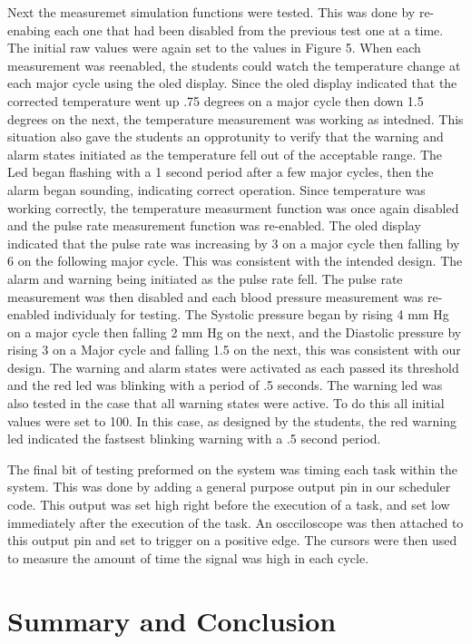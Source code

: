 \documentclass[12pt]{article} %
\begin{document}
Next the measuremet simulation functions were tested. This was done by
re-enabing each one that had been disabled from the previous test one at a
time. The initial raw values were again set to the values in Figure 5. When
each measurement was reenabled, the students could watch the temperature change
at each major cycle using the oled display. Since the oled display indicated
that the corrected temperature went up .75 degrees on a major cycle then down
1.5 degrees on the next, the temperature measurement was working as intedned.
This situation also gave the students an opprotunity to verify that the warning
and alarm states initiated as the temperature fell out of the acceptable range.
The Led began flashing with a 1 second period after a few major cycles, then
the alarm began sounding, indicating correct operation. Since temperature was
working correctly, the temperature measurment function was once again disabled
and the pulse rate measurement function was re-enabled. The oled display
indicated that the pulse rate was increasing by 3 on a major cycle then falling
by 6 on the following major cycle. This was consistent with the intended
design. The alarm and warning being initiated as the pulse rate fell. The pulse
rate measurement was then disabled and each blood pressure measurement was
re-enabled individualy for testing. The Systolic pressure began by rising 4 mm
Hg on a major cycle then falling 2 mm Hg on the next, and the Diastolic
pressure by rising 3 on a Major cycle and falling 1.5 on the next, this was
consistent with our design. The warning and alarm states were activated as each
passed its threshold and the red led was blinking with a period of .5 seconds.
The warning led was also tested in the case that all warning states were
active. To do this all initial values were set to 100. In this case, as
designed by the students, the red warning led indicated the fastsest blinking
warning with a .5 second period. 

The final bit of testing preformed on the system was timing each task within
the system. This was done by adding a general purpose output pin in our
scheduler code. This output was set high right before the execution of a task,
and set low immediately after the execution of the task. An oscciloscope was
then attached to this output pin and set to trigger on a positive edge. The
cursors were then used to measure the amount of time the signal was high in
each cycle.

\section{Summary and Conclusion}
\end{document}
